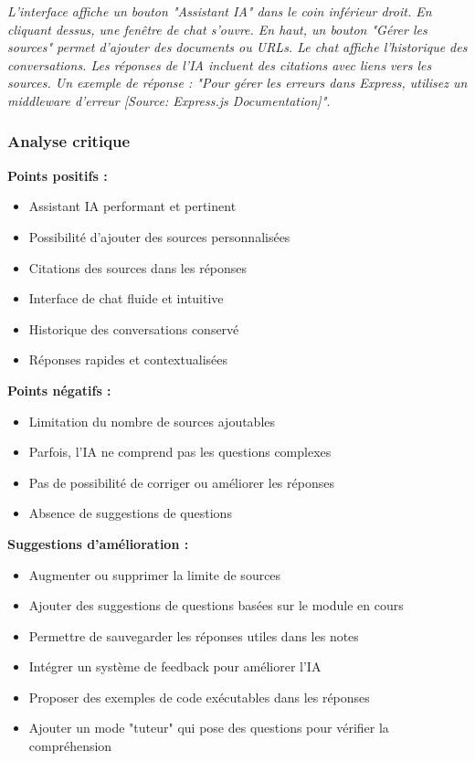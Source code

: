\documentclass[12pt,a4paper]{article}
\begin{document}
\textit{L'interface affiche un bouton "Assistant IA" dans le coin inférieur droit. En cliquant dessus, une fenêtre de chat s'ouvre. En haut, un bouton "Gérer les sources" permet d'ajouter des documents ou URLs. Le chat affiche l'historique des conversations. Les réponses de l'IA incluent des citations avec liens vers les sources. Un exemple de réponse : "Pour gérer les erreurs dans Express, utilisez un middleware d'erreur [Source: Express.js Documentation]".}

\subsubsection{Analyse critique}

\textbf{Points positifs :}
\begin{itemize}
    \item Assistant IA performant et pertinent
    \item Possibilité d'ajouter des sources personnalisées
    \item Citations des sources dans les réponses
    \item Interface de chat fluide et intuitive
    \item Historique des conversations conservé
    \item Réponses rapides et contextualisées
\end{itemize}

\textbf{Points négatifs :}
\begin{itemize}
    \item Limitation du nombre de sources ajoutables
    \item Parfois, l'IA ne comprend pas les questions complexes
    \item Pas de possibilité de corriger ou améliorer les réponses
    \item Absence de suggestions de questions
\end{itemize}

\textbf{Suggestions d'amélioration :}
\begin{itemize}
    \item Augmenter ou supprimer la limite de sources
    \item Ajouter des suggestions de questions basées sur le module en cours
    \item Permettre de sauvegarder les réponses utiles dans les notes
    \item Intégrer un système de feedback pour améliorer l'IA
    \item Proposer des exemples de code exécutables dans les réponses
    \item Ajouter un mode "tuteur" qui pose des questions pour vérifier la compréhension
\end{itemize}
\end{document}
